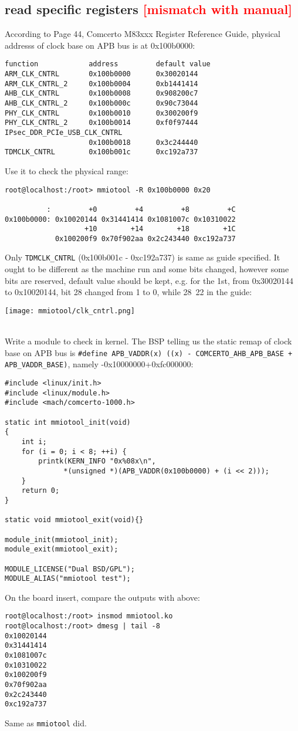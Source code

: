 \documentclass[a4paper]{report}
\begin{document}
\subsection{read specific registers \textcolor{red}{[mismatch with manual]}}
According to Page 44, {\sf Comcerto M83xxx Register Reference Guide}, physical 
addresss of clock base on APB bus is at 0x100b0000:
\begin{lstlisting}
function            address         default value
ARM_CLK_CNTRL       0x100b0000      0x30020144
ARM_CLK_CNTRL_2     0x100b0004      0xb1441414
AHB_CLK_CNTRL       0x100b0008      0x908200c7
AHB_CLK_CNTRL_2     0x100b000c      0x90c73044
PHY_CLK_CNTRL       0x100b0010      0x300200f9
PHY_CLK_CNTRL_2     0x100b0014      0xf0f97444
IPsec_DDR_PCIe_USB_CLK_CNTRL
                    0x100b0018      0x3c244440
TDMCLK_CNTRL        0x100b001c      0xc192a737
\end{lstlisting}
Use it to check the physical range:
\begin{lstlisting}
root@localhost:/root> mmiotool -R 0x100b0000 0x20

          :         +0         +4         +8         +C
0x100b0000: 0x10020144 0x31441414 0x1081007c 0x10310022 
                   +10        +14        +18        +1C
            0x100200f9 0x70f902aa 0x2c243440 0xc192a737
\end{lstlisting}
Only {\tt TDMCLK\_CNTRL} (0x100b001c - 0xc192a737) is same as guide specified. 
It ought to be different as the machine run and some bits changed, however some bits
are reserved, default value should be kept, e.g. for the 1st, from 0x30020144 to
0x10020144, bit 28 changed from 1 to 0, while 28~22 in the guide:
\\[\intextsep]
\begin{minipage}{\textwidth}
\centering
\texttt{[image: mmiotool/clk\_cntrl.png]}
\end{minipage}
\\[\intextsep]
Write a module to check in kernel. The BSP telling us the static remap of clock base
on APB bus is {\tt #define APB\_VADDR(x) ((x) - COMCERTO\_AHB\_APB\_BASE + 
APB\_VADDR\_BASE)}, namely -0x10000000+0xfc000000:
\begin{lstlisting}
#include <linux/init.h>
#include <linux/module.h>
#include <mach/comcerto-1000.h>

static int mmiotool_init(void)
{
    int i;
    for (i = 0; i < 8; ++i) {
        printk(KERN_INFO "0x%08x\n", 
              *(unsigned *)(APB_VADDR(0x100b0000) + (i << 2)));
    }
    return 0;
}

static void mmiotool_exit(void){}

module_init(mmiotool_init);
module_exit(mmiotool_exit);

MODULE_LICENSE("Dual BSD/GPL");
MODULE_ALIAS("mmiotool test");
\end{lstlisting}
On the board insert, compare the outputs with above:
\begin{lstlisting}
root@localhost:/root> insmod mmiotool.ko
root@localhost:/root> dmesg | tail -8 
0x10020144
0x31441414
0x1081007c
0x10310022
0x100200f9
0x70f902aa
0x2c243440
0xc192a737
\end{lstlisting}
Same as {\tt mmiotool} did.\\
\end{document}
